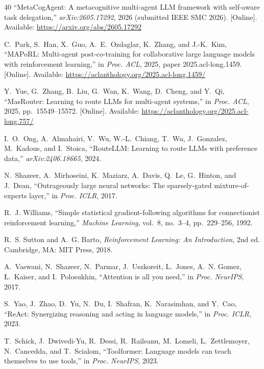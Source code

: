 \documentclass[journal,twocolumn,letterpaper]{IEEEtran}
\begin{document}
\begin{thebibliography}{40}
``MetaCogAgent: A metacognitive multi-agent LLM framework with self-aware
  task delegation,'' \emph{arXiv:2605.17292}, 2026 (submitted IEEE SMC 2026).
  [Online]. Available: \url{https://arxiv.org/abs/2605.17292}

C.~Park, S.~Han, X.~Guo, A.~E.~Ozdaglar, K.~Zhang, and J.-K.~Kim, ``MAPoRL:
  Multi-agent post-co-training for collaborative large language models with
  reinforcement learning,'' in \emph{Proc. ACL}, 2025, paper 2025.acl-long.1459.
  [Online]. Available: \url{https://aclanthology.org/2025.acl-long.1459/}

Y.~Yue, G.~Zhang, B.~Liu, G.~Wan, K.~Wang, D.~Cheng, and Y.~Qi, ``MasRouter:
  Learning to route LLMs for multi-agent systems,'' in \emph{Proc. ACL},
  2025, pp.\ 15549--15572. [Online]. Available:
  \url{https://aclanthology.org/2025.acl-long.757/}

I.~O.~Ong, A.~Almahairi, V.~Wu, W.-L.~Chiang, T.~Wu, J.~Gonzalez,
  M.~Kadous, and I.~Stoica, ``RouteLLM: Learning to route LLMs with
  preference data,'' \emph{arXiv:2406.18665}, 2024.

N.~Shazeer, A.~Mirhoseini, K.~Maziarz, A.~Davis, Q.~Le, G.~Hinton, and
  J.~Dean, ``Outrageously large neural networks: The sparsely-gated
  mixture-of-experts layer,'' in \emph{Proc. ICLR}, 2017.

R.~J. Williams, ``Simple statistical gradient-following algorithms for
  connectionist reinforcement learning,'' \emph{Machine Learning}, vol.~8,
  no.~3--4, pp.~229--256, 1992.

R.~S. Sutton and A.~G. Barto, \emph{Reinforcement Learning: An Introduction},
  2nd ed. Cambridge, MA: MIT Press, 2018.

A.~Vaswani, N.~Shazeer, N.~Parmar, J.~Uszkoreit, L.~Jones, A.~N. Gomez,
  \L.~Kaiser, and I.~Polosukhin, ``Attention is all you need,'' in
  \emph{Proc. NeurIPS}, 2017.

S.~Yao, J.~Zhao, D.~Yu, N.~Du, I.~Shafran, K.~Narasimhan, and Y.~Cao,
  ``ReAct: Synergizing reasoning and acting in language models,'' in
  \emph{Proc. ICLR}, 2023.

T.~Schick, J.~Dwivedi-Yu, R.~Dessi, R.~Raileanu, M.~Lomeli, L.~Zettlemoyer,
  N.~Cancedda, and T.~Scialom, ``Toolformer: Language models can teach
  themselves to use tools,'' in \emph{Proc. NeurIPS}, 2023.


\end{thebibliography}
\end{document}
